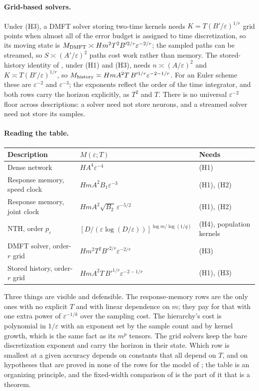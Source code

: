 \documentclass[11pt]{article}
\theoremstyle{definition}
\theoremstyle{remark}
\begin{document}
\paragraph{Grid-based solvers.}
Under (H3), a DMFT solver storing two-time kernels needs $K=T(B'/\varepsilon)^{1/r}$
grid points when almost all of the error budget is assigned to time
discretization, so its moving state is
$M_{\rm DMFT}\asymp Hm^2T^2B'^{2/r}\varepsilon^{-2/r}$; the sampled paths can be
streamed, so $S\asymp(A'/\varepsilon)^2$ paths cost work rather than memory.
The stored-history identity of , under (H1) and (H3), needs
$n\asymp(A/\varepsilon)^2$ and $K\asymp T(B'/\varepsilon)^{1/r}$, so
$M_{\rm history}\asymp HmA^2T\,B'^{1/r}\varepsilon^{-2-1/r}$.  For an Euler
scheme these are $\varepsilon^{-2}$ and $\varepsilon^{-3}$; the exponents
reflect the order of the time integrator, and both rows carry the horizon
explicitly, as $T^2$ and $T$.  There is no universal $\varepsilon^{-2}$ floor
across descriptions: a solver need not store neurons, and a streamed solver
need not store its samples.

\paragraph{Reading the table.}
\begin{center}
\small
\begin{tabular}{@{}lll@{}}
\toprule
Description & $M(\varepsilon;T)$ & Needs\\
\midrule
Dense network & $HA^4\varepsilon^{-4}$ & (H1)\\
Response memory, speed clock & $HmA^2B_1\varepsilon^{-3}$ & (H1), (H2)\\
Response memory, joint clock & $HmA^2\sqrt{B_2}\,\varepsilon^{-5/2}$ & (H1), (H2)\\
NTH, order $p_\varepsilon$ & $[D/(\varepsilon\log(D/\varepsilon))]^{\log m/\log(1/q)}$ & (H4), population kernels\\
DMFT solver, order-$r$ grid & $Hm^2T^2B'^{2/r}\varepsilon^{-2/r}$ & (H3)\\
Stored history, order-$r$ grid & $HmA^2T\,B'^{1/r}\varepsilon^{-2-1/r}$ & (H1), (H3)\\
\bottomrule
\end{tabular}
\end{center}
Three things are visible and defensible.  The response-memory rows are the
only ones with no explicit $T$ and with linear dependence on $m$; they pay for
that with one extra power of $\varepsilon^{-1/k}$ over the sampling cost.  The
hierarchy's cost is polynomial in $1/\varepsilon$ with an exponent set by the
sample count and by kernel growth, which is the same fact as its
$m^{p}$ tensors.  The grid solvers keep the bare discretization exponent and
carry the horizon in their state.  Which row is smallest at a given accuracy
depends on constants that all depend on $T$, and on hypotheses that are proved
in none of the rows for the model of ; the table is an
organizing principle, and the fixed-width comparison of  is the
part of it that is a theorem.
\end{document}
